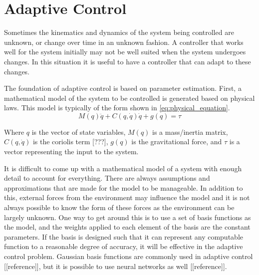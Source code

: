 \documentclass[letterpaper,12pt,titlepage,oneside,final]{book}
\begin{document}
\section{Adaptive Control}


Sometimes the kinematics and dynamics of the system being controlled are unknown, or change over time in an unknown fashion. 
A controller that works well for the system initially may not be well suited when the system undergoes changes. 
In this situation it is useful to have a controller that can adapt to these changes.

The foundation of adaptive control is based on parameter estimation. 
First, a mathematical model of the system to be controlled is generated based on physical laws. 
This model is typically of the form shown in \eqref{eq:physical_equation}.
\begin{equation} \label{eq:physical_equation}
M(q)\ddot{q} + C(q,\dot{q})\dot{q} + g(q) = \tau
\end{equation}

Where $q$ is the vector of state variables, $M(q)$ is a mass/inertia matrix, $C(q,\dot{q})$ is the coriolis term [???], $g(q)$ is the gravitational force, and $\tau$ is a vector representing the input to the system.


It is difficult to come up with a mathematical model of a system with enough detail to account for everything. 
There are always assumptions and approximations that are made for the model to be manageable. In addition to this, external forces from the environment may influence the model and it is not always possible to know the form of these forces as the environment can be largely unknown. 
One way to get around this is to use a set of basis functions as the model, and the weights applied to each element of the basis are the constant parameters. 
If the basis is designed such that it can represent any computable function to a reasonable degree of accuracy, it will be effective in the adaptive control problem. 
Gaussian basis functions are commonly used in adaptive control [[reference]], but it is possible to use neural networks as well [[reference]].
\end{document}
